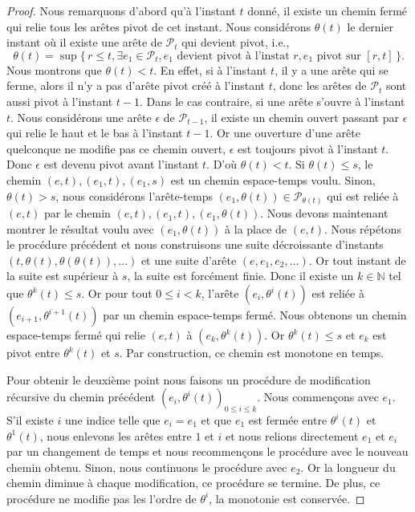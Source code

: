 \documentclass[titlepage,a4paper,12pt]{article}
\begin{document}
\begin{proof}
Nous remarquons d'abord qu'à l'instant $t$ donné, il existe un chemin fermé qui relie tous les arêtes pivot de cet instant. Nous considérons $\theta(t)$ le dernier instant où il existe une arête de $\mathcal{P}_t$ qui devient pivot, i.e.,
$$ \theta(t) = \sup \big\{ \,r\leqslant t, \exists e_1 \in \mathcal{P}_t, e_1 \text{ devient pivot à l'instat } r,e_1\text{ pivot sur }[r,t]\, \big\}.
$$
Nous montrons que $\theta(t)< t$. En effet, si à l'instant $t$, il y a une arête qui se ferme, alors il n'y a pas d'arête pivot créé à l'instant $t$, donc les arêtes de $\mathcal{P}_t$ sont aussi pivot à l'instant $t-1$. Dans le cas contraire, si une arête s'ouvre à l'instant $t$. Nous considérons une arête $\epsilon$ de $\mathcal{P}_{t-1}$, il existe un chemin ouvert passant par $\epsilon$ qui relie le haut et le bas à l'instant $t-1$. Or une ouverture d'une arête quelconque ne modifie pas ce chemin ouvert, $\epsilon$ est toujours pivot à l'instant $t$. Donc $\epsilon$ est devenu pivot avant l'instant $t$. D'où $\theta(t)< t$.
Si $\theta(t)\leqslant s$, le chemin $(e,t),(e_1,t),(e_1,s)$ est un chemin espace-temps voulu. Sinon, $\theta(t)> s$, nous considérons l'arête-temps $(e_1,\theta(t))\in \mathcal{P}_{\theta(t)}$ qui est reliée à $(e,t)$ par le chemin $(e,t),(e_1,t),(e_1,\theta(t))$. Nous devons maintenant montrer le résultat voulu avec $(e_1,\theta(t))$ à la place de $(e,t)$. Nous répétons le procédure précédent et nous construisons une suite décroissante d'instants $(t,\theta(t),\theta(\theta(t)),\dots)$ et une suite d'arête $(e,e_1,e_2,\dots)$. Or tout instant de la suite est supérieur à $s$, la suite est forcément finie. Donc il existe un $k\in\mathbb{N}$ tel que $\theta^k(t)\leqslant s$. Or pour tout $0\leqslant i < k$, l'arête $(e_i,\theta^i(t))$ est reliée à $(e_{i+1},\theta^{i+1}(t))$ par un chemin espace-temps fermé. Nous obtenons un chemin espace-temps fermé qui relie $(e,t)$ à $(e_k,\theta^k(t))$. Or $\theta^k(t)\leqslant s$ et $e_k$ est pivot entre $\theta^k(t)$ et $s$. Par construction, ce chemin est monotone en temps. 

Pour obtenir le deuxième point nous faisons un procédure de modification récursive du chemin précédent $(e_i,\theta^i(t))_{0\leqslant i \leqslant k}$. Nous commençons avec $e_1$. S'il existe $i$ une indice telle que $e_i=e_1$ et que $e_1$ est fermée entre $\theta^i(t)$ et $\theta^1(t)$, nous enlevons les arêtes entre $1$ et $i$ et nous relions directement $e_1$ et $e_i$ par un changement de temps et nous recommençons le procédure avec le nouveau chemin obtenu. Sinon, nous continuons le procédure avec $e_2$. Or la longueur du chemin diminue à chaque modification, ce procédure se termine. De plus, ce procédure ne modifie pas les l'ordre de $\theta^i$, la monotonie est conservée.
\end{proof}
\end{document}
